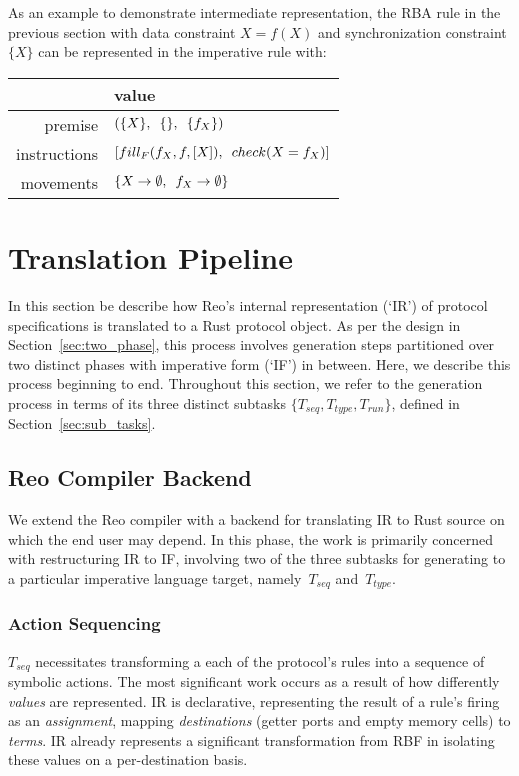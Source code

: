 As an example to demonstrate intermediate representation, the RBA rule in the previous section with data constraint $X=f(X)$
and synchronization constraint $\{X\}$ can be represented in the imperative rule with:

\vspace{1em}
\noindent{}
\begin{tabular}{r|l}
	\centering
	&  value \\ \hline
	premise	&  $(\{X\}, \enskip\{\}, \enskip\{f_X\})$ \\
	instructions	& $[fill_F(f_X, f, [X]), \enskip{} check(X = f_X)]$ \\
	movements	& $\{X \rightarrow{}\emptyset{}, \enskip f_X \rightarrow{}\emptyset{}\}$ 
\end{tabular}
\vspace{1em}

\section{Translation Pipeline}
\label{sec:translation_pipeline}
In this section be describe how Reo's internal representation (`IR') of protocol specifications is translated to a Rust protocol object. As per the design in Section~\ref{sec:two_phase}, this process involves generation steps partitioned over two distinct phases with imperative form (`IF') in between. Here, we describe this process beginning to end. Throughout this section, we refer to the generation process in terms of its three distinct subtasks $\{T_{seq}, T_{type}, T_{run}\}$, defined in Section~\ref{sec:sub_tasks}.

\subsection{Reo Compiler Backend}
\label{sec:translation_phase_1}
We extend the Reo compiler with a backend for translating IR to Rust source on which the end user may depend. In this phase, the work is primarily concerned with restructuring IR to IF, involving two of the three subtasks for generating to a particular imperative language target, namely~$T_{seq}$ and~$T_{type}$. 

\subsubsection{Action Sequencing}
$T_{seq}$ necessitates transforming a each of the protocol's rules into a sequence of symbolic actions. The most significant work occurs as a result of how differently \textit{values} are represented. IR is declarative, representing the result of a rule's firing as an \textit{assignment}, mapping \textit{destinations} (getter ports and empty memory cells) to \textit{terms}. IR already represents a significant transformation from RBF in isolating these values on a per-destination basis. 


